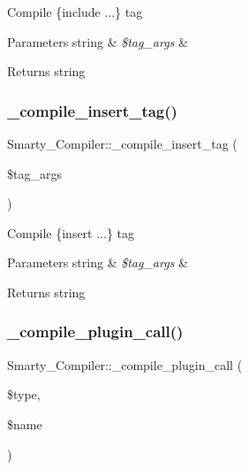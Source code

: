 Compile \{include ...\} tag


\begin{DoxyParams}[1]{Parameters}
string & {\em \$tag\+\_\+args} & \\
\hline
\end{DoxyParams}
\begin{DoxyReturn}{Returns}
string 
\end{DoxyReturn}
\mbox{\label{class_smarty___compiler_a4a9b22720c848862c5719a116246955d}} 
\subsubsection{\texorpdfstring{\+\_\+compile\+\_\+insert\+\_\+tag()}{\_compile\_insert\_tag()}}
{\footnotesize\ttfamily Smarty\+\_\+\+Compiler\+::\+\_\+compile\+\_\+insert\+\_\+tag (\begin{DoxyParamCaption}\item[{}]{\$tag\+\_\+args }\end{DoxyParamCaption})}

Compile \{insert ...\} tag


\begin{DoxyParams}[1]{Parameters}
string & {\em \$tag\+\_\+args} & \\
\hline
\end{DoxyParams}
\begin{DoxyReturn}{Returns}
string 
\end{DoxyReturn}
\mbox{\label{class_smarty___compiler_a302b33495a918bef95258bfb0285a30c}} 
\subsubsection{\texorpdfstring{\+\_\+compile\+\_\+plugin\+\_\+call()}{\_compile\_plugin\_call()}}
{\footnotesize\ttfamily Smarty\+\_\+\+Compiler\+::\+\_\+compile\+\_\+plugin\+\_\+call (\begin{DoxyParamCaption}\item[{}]{\$type,  }\item[{}]{\$name }\end{DoxyParamCaption})}

